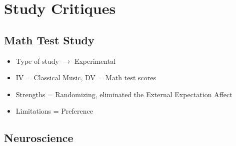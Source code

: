 \documentclass{report}
\newcommand{\nt}[1]{\begin{note}#1\end{note}}
\begin{document}
\section*{Study Critiques}

\subsection*{Math Test Study}

\nt{
\begin{itemize}
    \item Type of study $\rightarrow$ Experimental
    \item IV = Classical Music, DV = Math test scores
    \item Strengths = Randomizing, eliminated the External Expectation Affect
    \item Limitations = Preference
\end{itemize}
}

\subsection*{Neuroscience}
\end{document}
